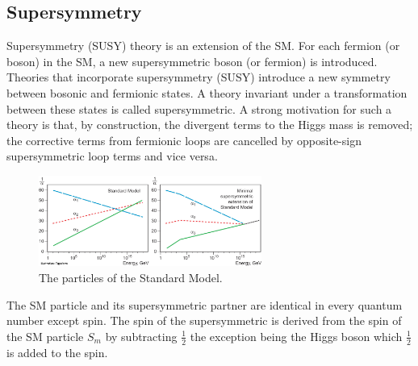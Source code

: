 \subsection{Supersymmetry\label{sec:SUSY}}

Supersymmetry (SUSY) theory is an extension of the SM. For each fermion (or boson) in
the SM, a new supersymmetric boson (or fermion) is introduced. Theories that incorporate 
supersymmetry (SUSY) introduce a new symmetry between bosonic and fermionic states. 
A theory invariant under a transformation between these states is called supersymmetric.
A strong motivation for such a theory is that, by construction, the divergent terms
to the Higgs mass is removed; the corrective terms from fermionic loops are cancelled by 
opposite-sign supersymmetric loop terms and vice versa. 

\begin{figure}[h!t]
  \begin{center}
       \includegraphics[width=0.65\textwidth,]{figures/phypub4highen.jpg}
       \caption{The particles of the Standard Model.}
    \label{fig:SM-particles}
  \end{center}
\end{figure}

The SM particle and its supersymmetric partner are identical in every quantum number except spin. 
The spin of the supersymmetric is derived from the spin of the SM particle $S_{m}$ by 
subtracting $\frac{1}{2}$ the exception being the Higgs boson which $\frac{1}{2}$ is added
to the spin.

